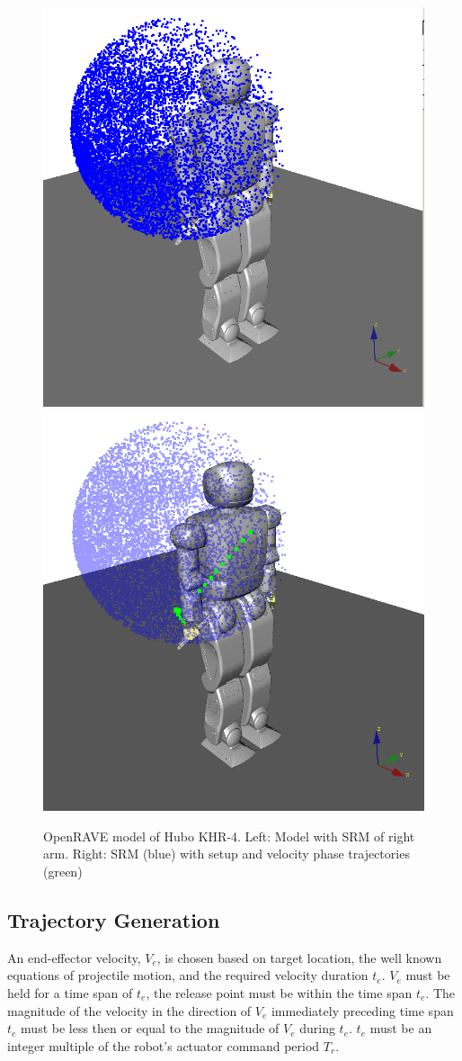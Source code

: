 \begin{figure}[thpb]
  \centering
\includegraphics[width=0.5\columnwidth]{./pictures/final/SRM.png}\includegraphics[width=0.5\columnwidth]{./pictures/final/ThrowTrajDiag.png}
  \caption{OpenRAVE model of Hubo KHR-4. Left: Model with SRM of right arm.  Right: SRM (blue) with setup and velocity phase trajectories (green)  }
  \label{fig:vHuboSparse}
\end{figure}



\subsection{Trajectory Generation}\label{sec:trajGen}
An end-effector velocity, $V_e$, is chosen based on target location, the well known equations of projectile motion, and the required velocity duration $t_e$.  $V_e$ must be held for a time span of $t_e$, the release point must be within the time span $t_e$.  The magnitude of the velocity in the direction of $V_e$ immediately preceding time span $t_e$ must be less then or equal to the magnitude of $V_e$ during $t_e$.  $t_e$ must be an integer multiple of the robot's actuator command period $T_r$.

